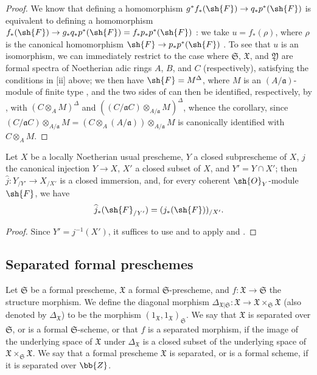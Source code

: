 \begin{proof}
We know that defining a homomorphism $g^*f_*(\sh{F}) \to q_*p^*(\sh{F})$ is equivalent to defining a homomorphism $f_*(\sh{F}) \to g_*q_*p^*(\sh{F}) = f_*p_*p^*(\sh{F})$ :
we take $u=f_*(\rho)$, where $\rho$ is the canonical homomorphism $\sh{F}\to p_*p^*(\sh{F})$ .
To see that $u$ is an isomorphism, we can immediately restrict to the case where $\mathfrak{S}$, $\mathfrak{X}$, and $\mathfrak{Y}$ are formal spectra of Noetherian adic rings $A$, $B$, and $C$ (respectively), satisfying the conditions in [ii] above;
we then have $\sh{F}=M^\Delta$, where $M$ is an $(A/\mathfrak{a})$-module of finite type , and the two sides of  can then be identified, respectively, by , with $(C\otimes_A M)^\Delta$ and $((C/\mathfrak{a}C)\otimes_{A/\mathfrak{a}}M)^\Delta$, whence the corollary, since $(C/\mathfrak{a}C)\otimes_{A/\mathfrak{a}}M = (C\otimes_A(A/\mathfrak{a}))\otimes_{A/\mathfrak{a}}M$ is canonically identified with $C\otimes_A M$.
\end{proof}

\begin{corollary}[10.14.7]
\label{I.10.14.7}
Let $X$ be a locally Noetherian usual prescheme, $Y$ a closed subprescheme of $X$, $j$ the canonical injection $Y\to X$, $X'$ a closed subset of $X$, and $Y'=Y\cap X'$;
then $\widehat{j}:Y_{/Y'}\to X_{/X'}$ is a closed immersion, and, for every coherent $\sh{O}_Y$-module $\sh{F}$, we have
\[
    \widehat{j}_*(\sh{F}_{/Y'}) = (j_*(\sh{F}))_{/X'}.
\]
\end{corollary}

\begin{proof}
Since $Y'=j^{-1}(X')$, it suffices to use  and to apply  and .
\end{proof}

\subsection{Separated formal preschemes}
\label{subsection:I.10.15}

\begin{definition}[10.15.1]
\label{I.10.15.1}
Let $\mathfrak{S}$ be a formal prescheme, $\mathfrak{X}$ a formal $\mathfrak{S}$-prescheme, and $f:\mathfrak{X}\to\mathfrak{S}$ the structure morphism.
We define the diagonal morphism $\Delta_{\mathfrak{X}|\mathfrak{S}}:\mathfrak{X}\to\mathfrak{X}\times_\mathfrak{S}\mathfrak{X}$ (also denoted by $\Delta_\mathfrak{X}$) to be the morphism $(1_\mathfrak{X},1_\mathfrak{X})_\mathfrak{S}$.
We say that $\mathfrak{X}$ is separated over $\mathfrak{S}$, or is a formal $\mathfrak{S}$-scheme, or that $f$ is a separated morphism, if the image of the underlying space of $\mathfrak{X}$ under $\Delta_\mathfrak{X}$ is a closed subset of the underlying space of $\mathfrak{X}\times_\mathfrak{S}\mathfrak{X}$.
We say that a formal prescheme $\mathfrak{X}$ is separated, or is a formal scheme, if it is separated over $\bb{Z}$.
\end{definition}

